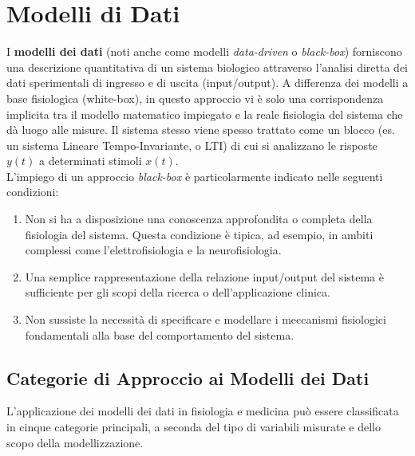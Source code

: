 \chapter{Modelli di Dati}
I \textbf{modelli dei dati} (noti anche come modelli \textit{data-driven} o \textit{black-box}) forniscono una descrizione quantitativa di un sistema biologico attraverso l'analisi diretta dei dati sperimentali di ingresso e di uscita (input/output). A differenza dei modelli a base fisiologica (white-box), in questo approccio vi è solo una corrispondenza implicita tra il modello matematico impiegato e la reale fisiologia del sistema che dà luogo alle misure. Il sistema stesso viene spesso trattato come un blocco (es. un sistema Lineare Tempo-Invariante, o LTI) di cui si analizzano le risposte $y(t)$ a determinati stimoli $x(t)$.\\
L'impiego di un approccio \textit{black-box} è particolarmente indicato nelle seguenti condizioni:
\begin{enumerate}
    \item Non si ha a disposizione una conoscenza approfondita o completa della fisiologia del sistema. Questa condizione è tipica, ad esempio, in ambiti complessi come l'elettrofisiologia e la neurofisiologia.
    \item Una semplice rappresentazione della relazione input/output del sistema è sufficiente per gli scopi della ricerca o dell'applicazione clinica.
    \item Non sussiste la necessità di specificare e modellare i meccanismi fisiologici fondamentali alla base del comportamento del sistema.
\end{enumerate}

\section{Categorie di Approccio ai Modelli dei Dati}
L'applicazione dei modelli dei dati in fisiologia e medicina può essere classificata in cinque categorie principali, a seconda del tipo di variabili misurate e dello scopo della modellizzazione.

